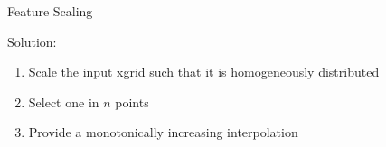 
\begin{frame}{Feature Scaling}

\vspace*{\titleskip}

Solution:
\begin{enumerate}
\item<1-|alert@1-3> Scale the input xgrid such that it is homogeneously distributed
\item<1-|alert@4> Select one in $n$ points  
\item<1-|alert@5> Provide a monotonically increasing interpolation
\end{enumerate}


\begin{center}
\end{center}

\end{frame}


